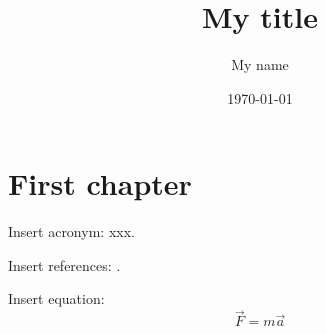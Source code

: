 \documentclass[12pt,a4paper]{memoir}
\title{My title}
\author{My name}
\date{\today}
\begin{document}
\maketitle

\tableofcontents

\chapter{First chapter}

Insert acronym: \gls{xxx}.

Insert references: \cite{key}.

Insert equation:
\begin{equation}
  \vec F = m \vec a
\end{equation}

\printglossaries

\printbibliography
\end{document}
